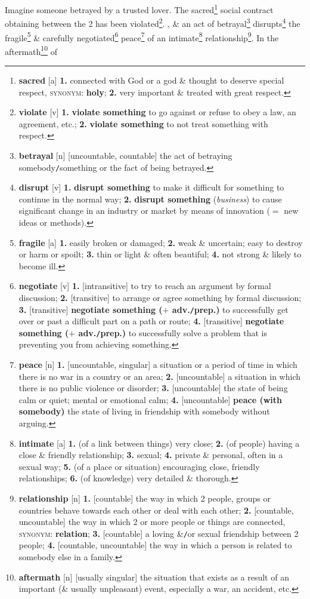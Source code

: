 \documentclass[oneside]{book}
\numberwithin{equation}{section}
\begin{document}
Imagine someone betrayed by a trusted lover. The sacred\footnote{\textbf{sacred} [a] \textbf{1.} connected with God or a god \& thought to deserve special respect, \textsc{synonym}: \textbf{holy}; \textbf{2.} very important \& treated with great respect.} social contract obtaining between the 2 has been violated\footnote{\textbf{violate} [v] \textbf{1.} \textbf{violate something} to go against or refuse to obey a law, an agreement, etc.; \textbf{2.} \textbf{violate something} to not treat something with respect.}. , \& an act of betrayal\footnote{\textbf{betrayal} [n] [uncountable, countable] the act of betraying somebody\texttt{/}something or the fact of being betrayed.} disrupts\footnote{\textbf{disrupt} [v] \textbf{1.} \textbf{disrupt something} to make it difficult for something to continue in the normal way; \textbf{2.} \textbf{disrupt something} (\textit{business}) to cause significant change in an industry or market by means of innovation ($=$ new ideas or methods).} the fragile\footnote{\textbf{fragile} [a] \textbf{1.} easily broken or damaged; \textbf{2.} weak \& uncertain; easy to destroy or harm or spoilt; \textbf{3.} thin or light \& often beautiful; \textbf{4.} not strong \& likely to become ill.} \& carefully negotiated\footnote{\textbf{negotiate} [v] \textbf{1.} [intransitive] to try to reach an argument by formal discussion; \textbf{2.} [transitive] to arrange or agree something by formal discussion; \textbf{3.} [transitive] \textbf{negotiate something ($+$ adv.\texttt{/}prep.)} to successfully get over or past a difficult part on a path or route; \textbf{4.} [transitive] \textbf{negotiate something ($+$ adv.\texttt{/}prep.)} to successfully solve a problem that is preventing you from achieving something.} peace\footnote{\textbf{peace} [n] \textbf{1.} [uncountable, singular] a situation or a period of time in which there is no war in a country or an area; \textbf{2.} [uncountable] a situation in which there is no public violence or disorder; \textbf{3.} [uncountable] the state of being calm or quiet; mental or emotional calm; \textbf{4.} [uncountable] \textbf{peace (with somebody)} the state of living in friendship with somebody without arguing.} of an intimate\footnote{\textbf{intimate} [a] \textbf{1.} (of a link between things) very close; \textbf{2.} (of people) having a close \& friendly relationship; \textbf{3.} sexual; \textbf{4.} private \& personal, often in a sexual way; \textbf{5.} (of a place or situation) encouraging close, friendly relationships; \textbf{6.} (of knowledge) very detailed \& thorough.} relationship\footnote{\textbf{relationship} [n] \textbf{1.} [countable] the way in which 2 people, groups or countries behave towards each other or deal with each other; \textbf{2.} [countable, uncountable] the way in which 2 or more people or things are connected, \textsc{synonym}: \textbf{relation}; \textbf{3.} [countable] a loving \&\texttt{/}or sexual friendship between 2 people; \textbf{4.} [countable, uncountable] the way in which a person is related to somebody else in a family.}. In the aftermath\footnote{\textbf{aftermath} [n] [usually singular] the situation that exists as a result of an important (\& usually unpleasant) event, especially a war, an accident, etc.} of 
\end{document}
